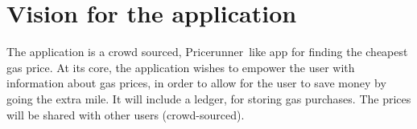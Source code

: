 
\chapter{Vision for the application}
The application is a crowd sourced, Pricerunner\texttrademark\ like app for finding the cheapest gas price. At its core, the application wishes to empower the user with information about gas prices, in order to allow for the user to save money by going the extra mile. It will include a ledger, for storing gas purchases. The prices will be shared with other users (crowd-sourced).
